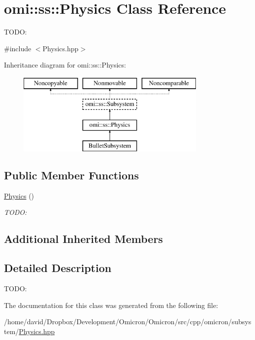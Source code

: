 \hypertarget{classomi_1_1ss_1_1_physics}{}\section{omi\+:\+:ss\+:\+:Physics Class Reference}
\label{classomi_1_1ss_1_1_physics}


T\+O\+DO\+:  




{\ttfamily \#include $<$Physics.\+hpp$>$}

Inheritance diagram for omi\+:\+:ss\+:\+:Physics\+:\begin{figure}[H]
\begin{center}
\leavevmode
\includegraphics[height=4.000000cm]{classomi_1_1ss_1_1_physics}
\end{center}
\end{figure}
\subsection*{Public Member Functions}
\begin{DoxyCompactItemize}
\item 
\hyperlink{classomi_1_1ss_1_1_physics_a7988787f455310cfa87ce29869bde107}{Physics} ()\hypertarget{classomi_1_1ss_1_1_physics_a7988787f455310cfa87ce29869bde107}{}\label{classomi_1_1ss_1_1_physics_a7988787f455310cfa87ce29869bde107}

\begin{DoxyCompactList}\small\item\em T\+O\+DO\+: \end{DoxyCompactList}\end{DoxyCompactItemize}
\subsection*{Additional Inherited Members}


\subsection{Detailed Description}
T\+O\+DO\+: 

The documentation for this class was generated from the following file\+:\begin{DoxyCompactItemize}
\item 
/home/david/\+Dropbox/\+Development/\+Omicron/\+Omicron/src/cpp/omicron/subsystem/\hyperlink{_physics_8hpp}{Physics.\+hpp}\end{DoxyCompactItemize}

